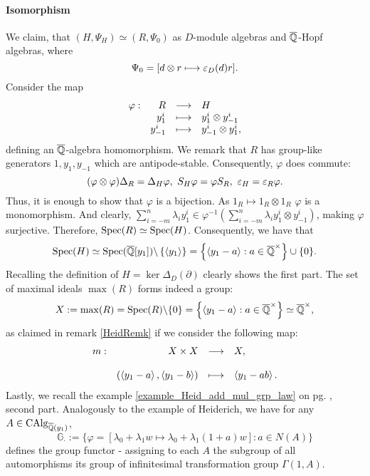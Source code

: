 \paragraph{Isomorphism}
We claim, that $(H, \Psi_H) \simeq (R, \Psi_0)$ as $D$-module algebras and $\currfield$-Hopf algebras,
 where
$$\Psi_0 = [d \otimes r \longmapsto \eps_D(d) r].$$
\bws Consider the map 
$$\bao{rrcl}
\varphi : &R &\longrightarrow &H\\
&y_1^i&\longmapsto&y_1^i \otimes y_{-1}^i\\
&y_{-1}^i&\longmapsto&y_{-1}^i \otimes y_1^i,\\
\ea$$
defining an $\currfield$-algebra homomorphism. We remark that $R$ has group-like generators $1, y_1, y_{-1}$ which are antipode-stable. Consequently, $\varphi$ does commute:
$$(\varphi \otimes \varphi) \Delta_R = \Delta_H \varphi,\ S_H \varphi = \varphi S_R,\ \eps_H = \eps_R \varphi.$$
Thus, it is enough to show that $\varphi$ is a bijection. As $1_R \longmapsto 1_R \otimes 1_R$ $\varphi$ is a monomorphism. And clearly, $\sum_{i=-m}^n \lambda_i y_1^i \in \varphi^{-1}\left(\sum_{i=-m}^n \lambda_i y_{1}^i \otimes y_{-1}^i\right)$, making $\varphi$ surjective. Therefore, $\trm{Spec}(R) \simeq \trm{Spec}(H)$. Consequently, we have that
$$\trm{Spec}(H) \simeq \trm{Spec}(\currfield[y_1]) \bsl \left\{\left<y_1\right>\right\} = \left\{\left<y_1 - a\right> : a \in \currfield^\times\right\} \cup \{0\}.$$
Recalling the definition of $H = \ker \Delta_D(\partial)$ clearly shows the first part. The set of maximal ideals $\max(R)$ forms indeed a group:
$$X := \max(R) = \trm{Spec}(R) \bsl \{0\} = \left\{\left<y_1 - a\right> : a \in \currfield^\times\right\} \simeq \currfield^\times,$$
as claimed in remark  \ref{HeidRemk} if we consider the following map:
$$\bao{rrcl}
m : &X \times X &\longrightarrow& X,\\
&&&\\
& \left(\left<y_1 - a\right>,\left<y_1 - b\right>\right) &\longmapsto& \left<y_1 - a b\right>.\\
\ea$$
Lastly, we recall the example \ref{example_Heid_add_mul_grp_law} on pg. \pageref{example_Heid_add_mul_grp_law}, second part. Analogously to the example of Heiderich, we have for any $A \in \trm{CAlg}_{\currfield(y_1)}$,
$$\mathbb{G}_\cdot := \{ \varphi = [\lambda_0 + \lambda_1 w \longmapsto \lambda_0 + \lambda_1 (1 + a) w] : a \in N(A)\}$$
defines the group functor - assigning to each $A$ the subgroup of all automorphisms its group of infinitesimal transformation group $\Gamma(1,A)$.%
